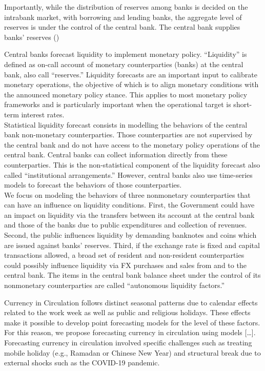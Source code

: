 Importantly, while the distribution of reserves  among banks is decided on the
intrabank market,  with borrowing  and lending banks,  the aggregate  level of
reserves is under  the control of the central bank.  The central bank supplies
banks' reserves ()








Central banks forecast liquidity to  implement monetary policy. “Liquidity” is
defined as on-call  account of monetary counterparties (banks)  at the central
bank,  also call  “reserves.” Liquidity  forecasts are  an important  input to
calibrate monetary  operations, the  objective of which  is to  align monetary
conditions with  the announced  monetary policy stance.  This applies  to most
monetary policy frameworks and is  particularly important when the operational
target is short-term interest rates.\\

Statistical  liquidity forecast  consists in  modelling the  behaviors of  the
central  bank  non-monetary  counterparties.   Those  counterparties  are  not
supervised by the central  bank and do not have access  to the monetary policy
operations of the central bank. Central banks can collect information directly
from  these  counterparties. This  is  the  non-statistical component  of  the
liquidity forecast also called “institutional arrangements.”  However, central
banks  also  use  time-series  models  to  forecast  the  behaviors  of  those
counterparties.\\

We focus  on modeling the  behaviors of three nonmonetary  counterparties that
can have  an influence  on liquidity conditions.  First, the  Government could
have  an impact  on liquidity  via the  transfers between  its account  at the
central bank and those of the  banks due to public expenditures and collection
of revenues.  Second, the public  influences liquidity by  demanding banknotes
and coins  which are issued  against banks’  reserves. Third, if  the exchange
rate is  fixed and capital transactions  allowed, a broad set  of resident and
non-resident  counterparties   could  possibly  influence  liquidity   via  FX
purchases and  sales from and  to the central bank.  The items in  the central
bank balance  sheet under  the control of  its nonmonetary  counterparties are
called “autonomous liquidity factors.”

Currency in  Circulation follows  distinct seasonal  patterns due  to calendar
effects  related   to  the  work  week   as  well  as  public   and  religious
holidays. These effects  make it possible to develop  point forecasting models
for  the level  of  these factors.  For this  reason,  we propose  forecasting
currency in circulation using models  […]. Forecasting currency in circulation
involved specific challenges such as treating mobile holiday (e.g., Ramadan or
Chinese New  Year) and  structural break  due to external  shocks such  as the
COVID-19 pandemic.

